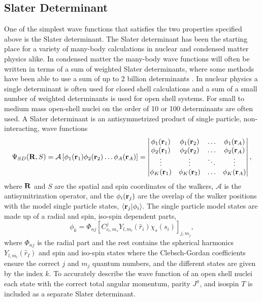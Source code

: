 \subsection{Slater Determinant}
One of the simplest wave functions that satisfies the two properties specified above is the Slater determinant. The Slater determinant has been the starting place for a variety of many-body calculations in nuclear and condensed matter physics alike. In condensed matter the many-body wave functions will often be written in terms of a sum of weighted Slater determinants, where some methods have been able to use a sum of up to 2 billion determinants \cite{huron1973,li2018}. In nuclear physics a single determinant is often used for closed shell calculations and a sum of a small number  of weighted determinants is used for open shell systems. For small to medium mass open-shell nuclei on the order of 10 or 100 determinants are often used. A Slater determinant is an antisymmetrized product of single particle, non-interacting, wave functions
\begin{equation}
   \Psi_{SD}(\mathbf{R},S) = \mathcal{A} \left[\phi_1(\mathbf{r}_1)\phi_2(\mathbf{r}_2) \ldots \phi_A(\mathbf{r}_A)\right] =
   \begin{vmatrix}
      \phi_1(\mathbf{r}_1) & \phi_1(\mathbf{r}_2) & \ldots & \phi_1(\mathbf{r}_A) \\
      \phi_2(\mathbf{r}_1) & \phi_2(\mathbf{r}_2) & \ldots & \phi_2(\mathbf{r}_A) \\
      \vdots & \vdots & \ddots & \vdots \\
      \phi_K(\mathbf{r}_1) & \phi_K(\mathbf{r}_2) & \ldots & \phi_K(\mathbf{r}_A) \\
   \end{vmatrix},
\end{equation}
where $\mathbf{R}$ and $S$ are the spatial and spin coordinates of the walkers, $\mathcal{A}$ is the antisymitrization operator, and the $\phi_i(\mathbf{r}_j)$ are the overlap of the walker positions with the model single particle states, $\left< \mathbf{r}_j | \phi_i \right>$. The single particle model states are made up of a radial and spin, iso-spin dependent parts,
\begin{equation}
   \phi_k = \Phi_{nj}\left[C_{c_l,m_s}^j Y_{l,m_l}(\hat{r}_i)\chi_s(s_i)\right]_{j,m_j},
\end{equation}
where $\Phi_{nj}$ is the radial part and the rest contains the spherical harmonics $Y_{l,m_l}(\hat{r}_I)$ and spin and iso-spin states where the Clebsch-Gordan coefficients ensure the correct $j$ and $m_j$ quantum numbers, and the different states are given by the index $k$. To accurately describe the wave function of an open shell nuclei each state with the correct total angular momentum, parity $J^\pi$, and isospin $T$ is included as a separate Slater determinant.
